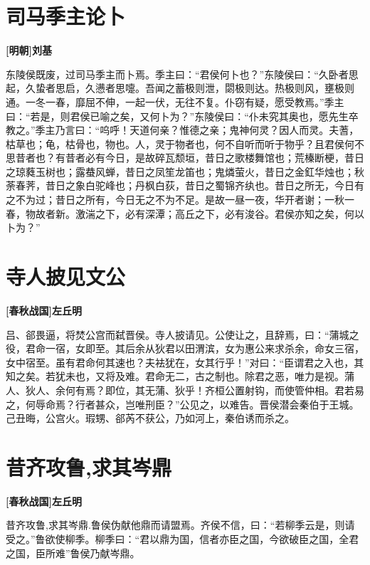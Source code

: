 \documentclass[UTF8,titlepage,oneside]{ctexbook}
\begin{document}
\chapter*{司马季主论卜}
\begin{center}
	\textbf{[明朝]刘基}
\end{center}


东陵侯既废，过司马季主而卜焉。季主曰：“君侯何卜也？”东陵侯曰：“久卧者思起，久蛰者思启，久懑者思嚏。吾闻之蓄极则泄，閟极则达。热极则风，壅极则通。一冬一春，靡屈不伸，一起一伏，无往不复。仆窃有疑，愿受教焉。”季主曰：“若是，则君侯已喻之矣，又何卜为？”东陵侯曰：“仆未究其奥也，愿先生卒教之。”季主乃言曰：“呜呼！天道何亲？惟德之亲；鬼神何灵？因人而灵。夫蓍，枯草也；龟，枯骨也，物也。人，灵于物者也，何不自听而听于物乎？且君侯何不思昔者也？有昔者必有今日，是故碎瓦颓垣，昔日之歌楼舞馆也；荒榛断梗，昔日之琼蕤玉树也；露蛬风蝉，昔日之凤笙龙笛也；鬼燐萤火，昔日之金釭华烛也；秋荼春荠，昔日之象白驼峰也；丹枫白荻，昔日之蜀锦齐纨也。昔日之所无，今日有之不为过；昔日之所有，今日无之不为不足。是故一昼一夜，华开者谢；一秋一春，物故者新。激湍之下，必有深潭；高丘之下，必有浚谷。君侯亦知之矣，何以卜为？”

\chapter*{寺人披见文公}
\begin{center}
	\textbf{[春秋战国]左丘明}
\end{center}


吕、郤畏逼，将焚公宫而弑晋侯。寺人披请见。公使让之，且辞焉，曰：“蒲城之役，君命一宿，女即至。其后余从狄君以田渭滨，女为惠公来求杀余，命女三宿，女中宿至。虽有君命何其速也？夫袪犹在，女其行乎！”对曰：“臣谓君之入也，其知之矣。若犹未也，又将及难。君命无二，古之制也。除君之恶，唯力是视。蒲人、狄人、余何有焉？即位，其无蒲、狄乎！齐桓公置射钩，而使管仲相。君若易之，何辱命焉？行者甚众，岂唯刑臣？”公见之，以难告。晋侯潜会秦伯于王城。己丑晦，公宫火。瑕甥、郤芮不获公，乃如河上，秦伯诱而杀之。

\chapter*{昔齐攻鲁,求其岑鼎}
\begin{center}
	\textbf{[春秋战国]左丘明}
\end{center}


昔齐攻鲁,求其岑鼎.鲁侯伪献他鼎而请盟焉。齐侯不信，曰：“若柳季云是，则请受之。”鲁欲使柳季。柳季曰：“君以鼎为国，信者亦臣之国，今欲破臣之国，全君之国，臣所难”鲁侯乃献岑鼎。
\end{document}
